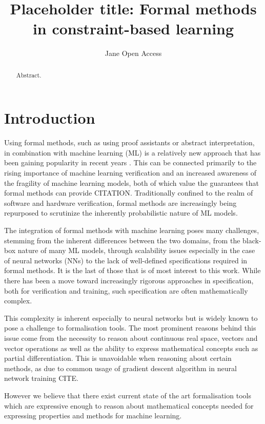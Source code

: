 \documentclass[a4paper,UKenglish,cleveref, autoref, thm-restate]{lipics-v2021}
\title{Placeholder title: Formal methods in constraint-based learning} %
\author{Jane {Open Access}}{Dummy University Computing Laboratory, [optional: Address], Country \and My second affiliation, Country \and \url{http://www.myhomepage.edu} }{johnqpublic@dummyuni.org}{https://orcid.org/0000-0002-1825-0097}{(Optional) author-specific funding acknowledgements}%
\begin{document}
\maketitle

\begin{abstract}
Abstract.
\end{abstract}


\section{Introduction}

Using formal methods, such as using proof assistants or abstract interpretation, in combination with machine learning (ML) is a relatively new approach that has been gaining popularity in recent years \cite{urban2021review,9842406}. 
This can be connected primarily to the rising importance of machine learning verification and an increased awareness of the fragility of machine learning models, both of which value the guarantees that formal methods can provide CITATION.
Traditionally confined to the realm of software and hardware verification, formal methods are increasingly being repurposed to scrutinize the inherently probabilistic nature of ML models.

The integration of formal methods with machine learning poses many challenges, stemming from the inherent differences between the two domains, from the black-box nature of many ML models, through scalability issues especially in the case of neural networks (NNs) to the lack of well-defined specifications required in formal methods. It is the last of those that is of most interest to this work. While there has been a move toward increasingly rigorous approaches in specification, both for verification and training, such specification are often mathematically complex. 

This complexity is inherent especially to neural networks but is widely known to pose a challenge to formalisation tools. The most prominent reasons behind this issue come from the necessity to reason about continuous real space, vectors and vector operations as well as the ability to express mathematical concepts such as partial differentiation. This is unavoidable when reasoning about certain methods, as due to common usage of gradient descent algorithm in neural network training CITE.

However we believe that there exist current state of the art formalisation tools which are expressive enough to reason about mathematical concepts needed for expressing properties and methods for machine learning.
\end{document}
